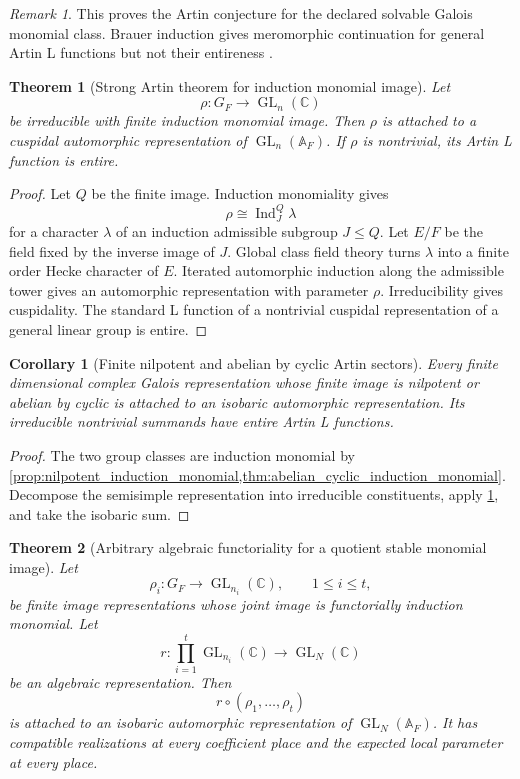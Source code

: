 \documentclass{aomart}
\newtheorem{theorem}{Theorem}[section]
\newtheorem{corollary}[corollary]{Corollary}
\theoremstyle{definition}
\theoremstyle{remark}
\newtheorem{remark}[remark]{Remark}
\newcommand{\CC}{\mathbb C}
\newcommand{\GL}{\operatorname{GL}}
\newcommand{\Ind}{\operatorname{Ind}}
\newcommand{\Adele}{\mathbb A}
\begin{document}
\begin{remark}\label{rem:artin_scope}
This proves the Artin conjecture for the declared solvable Galois monomial class. Brauer induction gives meromorphic continuation for general Artin L functions but not their entireness \cite{Brauer1947}.
\end{remark}

\begin{theorem}[Strong Artin theorem for induction monomial image]\label{thm:nilpotent_strong_artin}
Let
\[
\rho:G_F\longrightarrow\GL_n(\CC)
\]
be irreducible with finite induction monomial image. Then \(\rho\) is attached to a cuspidal automorphic representation of \(\GL_n(\Adele_F)\). If \(\rho\) is nontrivial, its Artin L function is entire.
\end{theorem}

\begin{proof}
Let \(Q\) be the finite image. Induction monomiality gives
\[
\rho\cong\Ind_J^Q\lambda
\]
for a character \(\lambda\) of an induction admissible subgroup \(J\leq Q\). Let \(E/F\) be the field fixed by the inverse image of \(J\). Global class field theory turns \(\lambda\) into a finite order Hecke character of \(E\). Iterated automorphic induction along the admissible tower gives an automorphic representation with parameter \(\rho\). Irreducibility gives cuspidality. The standard L function of a nontrivial cuspidal representation of a general linear group is entire.
\end{proof}

\begin{corollary}[Finite nilpotent and abelian by cyclic Artin sectors]\label{cor:nilpotent_all_artin}
Every finite dimensional complex Galois representation whose finite image is nilpotent or abelian by cyclic is attached to an isobaric automorphic representation. Its irreducible nontrivial summands have entire Artin L functions.
\end{corollary}

\begin{proof}
The two group classes are induction monomial by \cref{prop:nilpotent_induction_monomial,thm:abelian_cyclic_induction_monomial}. Decompose the semisimple representation into irreducible constituents, apply \cref{thm:nilpotent_strong_artin}, and take the isobaric sum.
\end{proof}

\begin{theorem}[Arbitrary algebraic functoriality for a quotient stable monomial image]\label{thm:nilpotent_algebraic_functoriality}
Let
\[
\rho_i:G_F\longrightarrow\GL_{n_i}(\CC),
\qquad
1\leq i\leq t,
\]
be finite image representations whose joint image is functorially induction monomial. Let
\[
r:\prod_{i=1}^{t}\GL_{n_i}(\CC)\longrightarrow\GL_N(\CC)
\]
be an algebraic representation. Then
\[
\boxed{
r\circ(\rho_1,\ldots,\rho_t)
}
\]
is attached to an isobaric automorphic representation of \(\GL_N(\Adele_F)\). It has compatible realizations at every coefficient place and the expected local parameter at every place.
\end{theorem}
\end{document}
